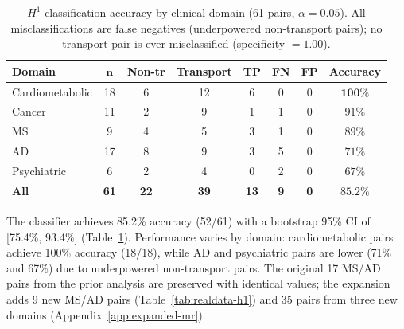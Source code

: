 \documentclass{article}
\begin{document}
\begin{table}[t]
\centering
\caption{$H^1$ classification accuracy by clinical domain (61 pairs, $\alpha = 0.05$). All misclassifications are false negatives (underpowered non-transport pairs); no transport pair is ever misclassified (specificity $= 1.00$).}
\label{tab:realdata-domain}
\small
\begin{tabular}{@{}lccccccc@{}}
\toprule
\textbf{Domain} & $\boldsymbol{n}$ & \textbf{Non-tr} & \textbf{Transport} & \textbf{TP} & \textbf{FN} & \textbf{FP} & \textbf{Accuracy} \\
\midrule
Cardiometabolic & 18 & 6 & 12 & 6 & 0 & 0 & $\mathbf{100\%}$ \\
Cancer & 11 & 2 & 9 & 1 & 1 & 0 & $91\%$ \\
MS & 9 & 4 & 5 & 3 & 1 & 0 & $89\%$ \\
AD & 17 & 8 & 9 & 3 & 5 & 0 & $71\%$ \\
Psychiatric & 6 & 2 & 4 & 0 & 2 & 0 & $67\%$ \\
\midrule
\textbf{All} & \textbf{61} & \textbf{22} & \textbf{39} & \textbf{13} & \textbf{9} & \textbf{0} & $\mathbf{85.2\%}$ \\
\bottomrule
\end{tabular}
\end{table}

The classifier achieves 85.2\% accuracy (52/61) with a bootstrap 95\% CI of [75.4\%, 93.4\%] (Table~\ref{tab:realdata-domain}). Performance varies by domain: cardiometabolic pairs achieve 100\% accuracy (18/18), while AD and psychiatric pairs are lower (71\% and 67\%) due to underpowered non-transport pairs. The original 17 MS/AD pairs from the prior analysis are preserved with identical values; the expansion adds 9 new MS/AD pairs (Table~\ref{tab:realdata-h1}) and 35 pairs from three new domains (Appendix~\ref{app:expanded-mr}).
\end{document}
